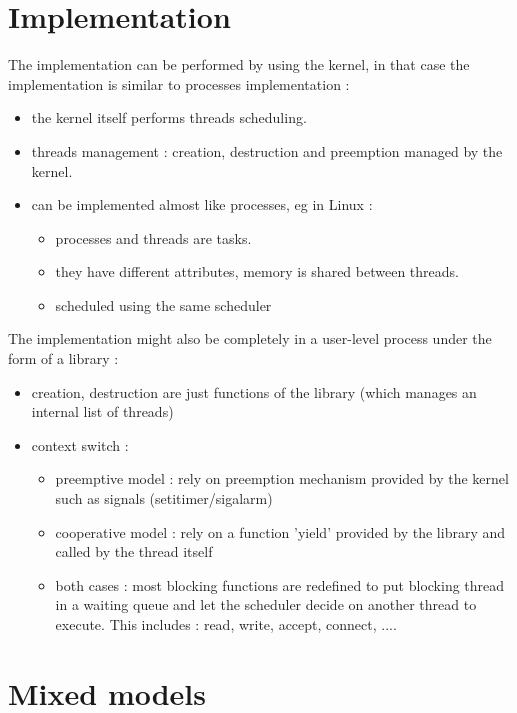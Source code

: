 \section{Implementation}

The implementation can be performed by using the kernel, in that case the implementation
is similar to processes implementation :

\begin{itemize}
\item the kernel itself performs threads scheduling.
\item threads management : creation, destruction and preemption managed by the kernel.
\item can be implemented almost like processes, eg in Linux :
\begin{itemize}
\item processes and threads are tasks.
\item they have different attributes, memory is shared between threads.
\item scheduled using the same scheduler
\end{itemize}
\end{itemize}

The implementation might also be completely in a user-level process under the form of a library :

\begin{itemize}
\item creation, destruction are just functions of the library (which manages an internal list of threads)
\item context switch :
\begin{itemize}
\item preemptive model : rely on preemption mechanism provided by  the kernel such as signals (setitimer/sigalarm)
\item cooperative model : rely on a function 'yield' provided by the library and called by the thread itself
\item both cases : most blocking functions are redefined to put blocking thread in a waiting queue and let the scheduler decide on another thread to execute. This includes : read, write, accept, connect, ....
\end{itemize}
\end{itemize}

\vspace{3cm}

\section{Mixed models}

